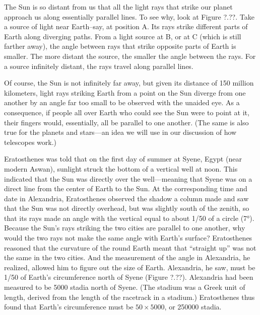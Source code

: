 \documentclass[main.tex]{subfiles}
\begin{document}
\vspace{1em}

The Sun is so distant from us that all the light rays that strike our planet approach us along essentially parallel lines. To see why, look at Figure ?.??. Take a source of light near Earth--say, at position A. Its rays strike different parts of Earth along diverging paths. From a light source at B, or at C (which is still farther away), the angle between rays that strike opposite parts of Earth is smaller. The more distant the source, the smaller the angle between the rays. For a source infinitely distant, the rays travel along parallel lines.


\vspace{1em}

Of course, the Sun is not infinitely far away, but given its distance of 150 million kilometers, light rays striking Earth from a point on the Sun diverge from one another by an angle far too small to be observed with the unaided eye. As a consequence, if people all over Earth who could see the Sun were to point at it, their fingers would, essentially, all be parallel to one another. (The same is also true for the planets and stars---an idea we will use in our discussion of how telescopes work.)

\vspace{1em}

Eratosthenes was told that on the first day of summer at Syene, Egypt (near modern Aswan), sunlight struck the bottom of a vertical well at noon. This indicated that the Sun was directly over the well---meaning that Syene was on a direct line from the center of Earth to the Sun. At the corresponding time and date in Alexandria, Eratosthenes observed the shadow a column made and saw that the Sun was not directly overhead, but was slightly south of the zenith, so that its rays made an angle with the vertical equal to about 1/50 of a circle (\ang{7}). Because the Sun's rays striking the two cities are parallel to one another, why would the two rays not make the same angle with Earth's surface? Eratosthenes reasoned that the curvature of the round Earth meant that ``straight up'' was not the same in the two cities. And the measurement of the angle in Alexandria, he realized, allowed him to figure out the size of Earth. Alexandria, he saw, must be 1/50 of Earth's circumference north of Syene (Figure ?.??). Alexandria had been measured to be 5000 stadia north of Syene. (The stadium was a Greek unit of length, derived from the length of the racetrack in a stadium.) Eratosthenes thus found that Earth's circumference must be $50 \times 5000$, or \num{250000} stadia.
\end{document}
